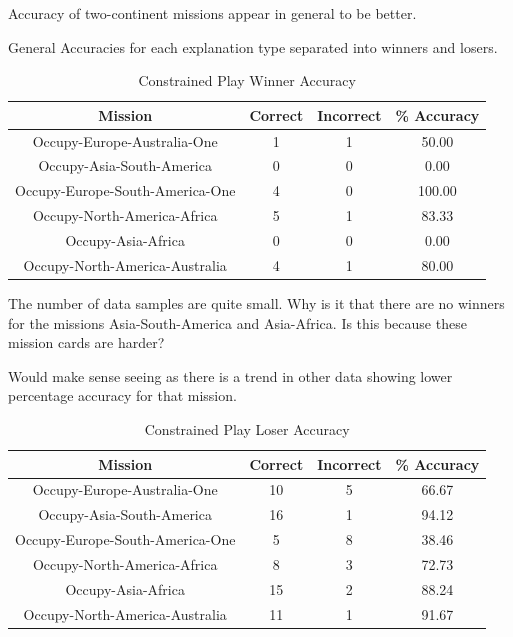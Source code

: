 \documentclass[parskip]{cs4rep}
\begin{document}
Accuracy of two-continent missions appear in general to be better.

General Accuracies for each explanation type separated into winners and losers.

\begin{table}[ht]
\centering
\begin{tabular}{|c|c|c|c|}
\hline 
\textbf{Mission} & \textbf{Correct} & \textbf{Incorrect} & \textbf{\% Accuracy} \\ 
\hline 
Occupy-Europe-Australia-One & 1 & 1 & 50.00 \\  
\hline 
Occupy-Asia-South-America & 0 & 0 & 0.00 \\ 
\hline
Occupy-Europe-South-America-One & 4 & 0 & 100.00 \\
\hline
Occupy-North-America-Africa & 5 & 1 & 83.33 \\
\hline
Occupy-Asia-Africa & 0 & 0 & 0.00 \\
\hline
Occupy-North-America-Australia & 4 & 1 & 80.00 \\
\hline
\end{tabular}
\caption{Constrained Play Winner Accuracy}
\label{table:continent-bonus}
\end{table}
		
The number of data samples are quite small.	Why is it that there are no winners for the missions Asia-South-America and Asia-Africa. Is this because these mission cards are harder?

Would make sense seeing as there is a trend in other data showing lower percentage accuracy for that mission.
		
\begin{table}[ht]
\centering	
\begin{tabular}{|c|c|c|c|}
\hline 
\textbf{Mission} & \textbf{Correct} & \textbf{Incorrect} & \textbf{\% Accuracy} \\ 
\hline 
Occupy-Europe-Australia-One & 10 & 5 & 66.67 \\  
\hline 
Occupy-Asia-South-America & 16 & 1 & 94.12 \\ 
\hline
Occupy-Europe-South-America-One & 5 & 8 & 38.46 \\
\hline
Occupy-North-America-Africa & 8 & 3 & 72.73 \\
\hline
Occupy-Asia-Africa & 15 & 2 & 88.24 \\
\hline
Occupy-North-America-Australia & 11 & 1 & 91.67 \\
\hline
\end{tabular}
\caption{Constrained Play Loser Accuracy}
\label{table:constrained-lose-accuracy}
\end{table}			
\end{document}
